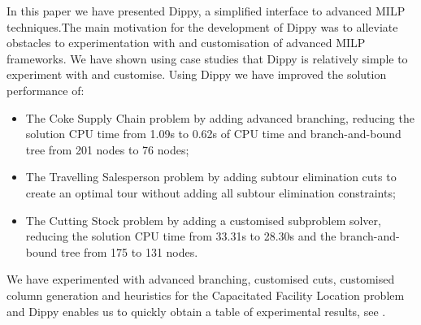 In this paper we have presented Dippy, a simplified interface to advanced \acl{MILP} techniques.The main motivation for the development of Dippy was to alleviate obstacles to experimentation with and customisation of advanced \ac{MILP} frameworks. We have shown using case studies that Dippy is relatively simple to experiment with and customise. Using Dippy we have improved the solution performance of:
\begin{itemize}
\item The Coke Supply Chain problem by adding advanced branching, reducing the solution CPU time from 1.09s to 0.62s of CPU time and branch-and-bound tree from 201 nodes to 76 nodes;
\item The Travelling Salesperson problem by adding subtour elimination cuts to create an optimal tour without adding all subtour elimination constraints;
\item The Cutting Stock problem by adding a customised subproblem solver, reducing the solution CPU time from 33.31s to 28.30s and the branch-and-bound tree from 175 to 131 nodes.
\end{itemize}
We have experimented with advanced branching, customised cuts, customised column generation and heuristics for the Capacitated Facility Location problem and Dippy enables us to quickly obtain a table of experimental results, see .
